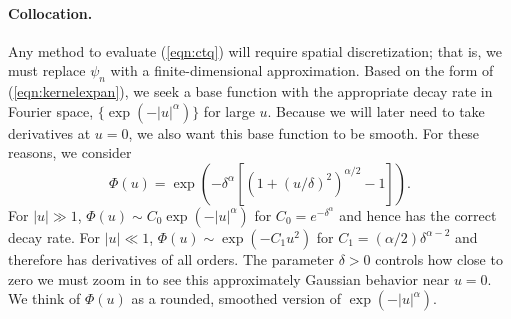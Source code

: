 \documentclass[12pt]{l4dc2021}
\begin{document}
\paragraph{Collocation.} Any method to evaluate (\ref{eqn:ctq}) will require spatial discretization; that is, we must replace $\psi_n$ with a finite-dimensional approximation.  Based on the form of (\ref{eqn:kernelexpan}), we seek a base function with the appropriate decay rate in Fourier space, $\{ \exp( -|u|^\alpha )\}$ for large $u$.  Because we will later need to take derivatives at $u=0$, we also want this base function to be smooth.  For these reasons, we consider
\begin{equation}
\label{eqn:basefun}
\Phi(u) = \exp \left( -\delta^\alpha \left[ ( 1 + (u/\delta)^2 )^{\alpha/2} - 1 \right] \right).
\end{equation}
For $|u| \gg 1$, $\Phi(u) \sim C_0 \exp \left( -|u|^\alpha \right)$ for $C_0 = e^{- \delta^\alpha}$ and hence has the correct decay rate.  For $|u| \ll 1$, $\Phi(u) \sim \exp(-C_1 u^2)$ for $C_1 = (\alpha/2) \delta^{\alpha - 2}$ and therefore has derivatives of all orders. The parameter $\delta > 0$ controls how close to zero we must zoom in to see this approximately Gaussian behavior near $u=0$.  We think of $\Phi(u)$ as a rounded, smoothed version of $\exp( -|u|^\alpha )$. 
\end{document}
